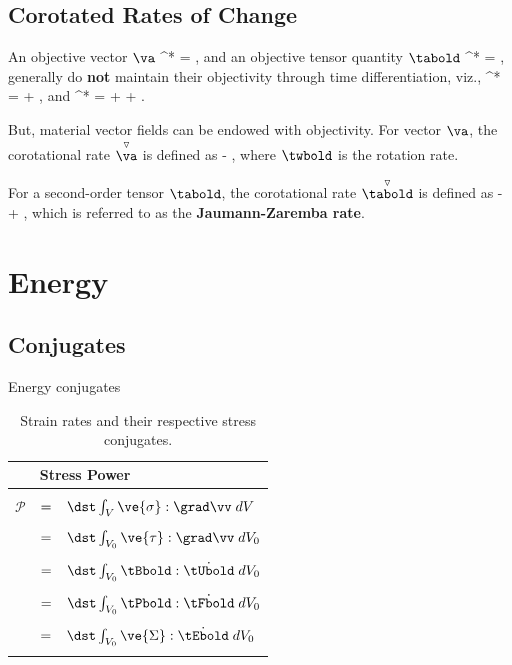 \section{Corotated Rates of Change}
An objective vector $\va$ 
\be
 \va^* = \tRbold \; \va,
\ee
and an objective tensor quantity $\tabold$ 
\be
 \tabold^* = \tRbold \; \tabold \; \tRbold\transpose,
\ee
generally do {\bf not} maintain their objectivity through
time differentiation, viz.,
\be
 \dot{\va}^* = \dot{\tRbold} \; \va + \tRbold \; \dot{\va},
\ee
and
\be
 \dot{\tabold}^* = 
 \dot{\tRbold} \; \tabold \; \tRbold\transpose + 
 \tRbold \; \dot{\tabold} \; \tRbold\transpose + 
 \tRbold \; \tabold \; \dot{\tRbold}\transpose.
\ee

But, material vector fields can be endowed with objectivity.
For vector $\va$, the 
corotational rate 
$\overset{\triangledown}{\va}$ is defined as
\be
 \overset{\triangledown}{\va}
  \dot{\va} - \twbold \; \va,
\ee
where $\twbold$ is the rotation rate.

For a second-order tensor $\tabold$, the 
corotational rate $\overset{\triangledown}{\tabold}$ is defined as
\be
 \overset{\triangledown}{\tabold}  \dot{\tabold} - \twbold \; \tabold
 + \tabold \; \twbold,
\ee
which is referred to as the {\bf Jaumann-Zaremba rate}.

\chapter{Energy}
\section{Conjugates}
\label{section:conjugates}
Energy conjugates

\begin{table}[htb]
\begin{center}
\begin{tabular}{|cl|} \hline
     & {\bf Stress Power} \\ \hline \hline
     &  \\
 $\mathcal{P}$ 
   & $=\;\;\;\dst\int_{V} \ve{\sigma} : \grad\vv \; dV $ \\
   & \\
   & $=\;\;\;\dst\int_{V_0} \ve{\tau} : \grad\vv \; dV_0 $ \\
   & \\ 
   & $=\;\;\;\dst\int_{V_0} \tBbold : \dot{\tUbold} \; dV_0 $ \\
   & \\ 
   & $=\;\;\;\dst\int_{V_0} \tPbold : \dot{\tFbold} \; dV_0 $ \\
   & \\ 
   & $=\;\;\;\dst\int_{V_0} \ve{\Sigma} : \dot{\tEbold} \; dV_0 $ \\
   & \\ \hline
\end{tabular}
\end{center}
\caption{Strain rates  
and their respective stress conjugates.}
\label{tab:table_of_conjugate_power}
\end{table}

